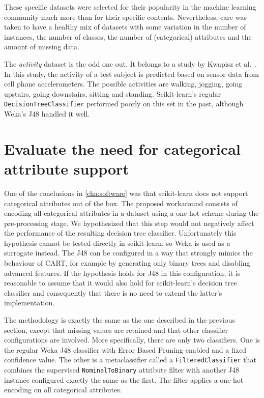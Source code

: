 These specific datasets were selected for their popularity in the machine learning community much more than for their specific contents. Nevertheless, care was taken to have a healthy mix of datasets with some variation in the number of instances, the number of classes, the number of (categorical) attributes and the amount of missing data.

The \emph{activity} dataset is the odd one out. It belongs to a study by Kwapisz et al.~\cite{problematic_dataset}. In this study, the activity of a test subject is predicted based on sensor data from cell phone accelerometers. The possible activities are walking, jogging, going upstairs, going downstairs, sitting and standing. Scikit-learn's regular \texttt{DecisionTreeClassifier} performed poorly on this set in the past, although Weka's J48 handled it well.

\section{Evaluate the need for categorical attribute support}\label{sec:meth_cat_attr}
One of the conclusions in \autoref{cha:software} was that scikit-learn does not support categorical attributes out of the box. The proposed workaround consists of encoding all categorical attributes in a dataset using a one-hot scheme during the pre-processing stage. We hypothesized that this step would not negatively affect the performance of the resulting decision tree classifier. Unfortunately this hypothesis cannot be tested directly in scikit-learn, so Weka is used as a surrogate instead. The J48 can be configured in a way that strongly mimics the behaviour of CART, for example by generating only binary trees and disabling advanced features. If the hypothesis holds for J48 in this configuration, it is reasonable to assume that it would also hold for scikit-learn's decision tree classifier and consequently that there is no need to extend the latter's implementation.

The methodology is exactly the same as the one described in the previous section, except that missing values are retained and that other classifier configurations are involved. More specifically, there are only two classifiers. One is the regular Weka J48 classifier with Error Based Pruning enabled and a fixed confidence value. The other is a metaclassifier called a \texttt{FilteredClassifier} that combines the supervised \texttt{NominalToBinary} attribute filter with another J48 instance configured exactly the same as the first. The filter applies a one-hot encoding on all categorical attributes.


